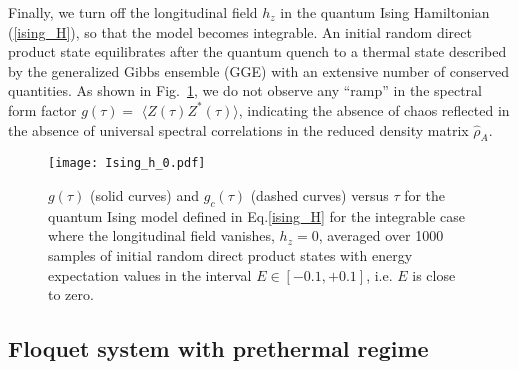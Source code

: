\documentclass[aps,prb,preprint,onecolumn,amsmath,amssymb,superscriptaddress,eqsecnum,floatfix,scrartcl]{revtex4-1}
\begin{document}
Finally, we turn off the longitudinal field $h_z$
in the quantum Ising Hamiltonian (\ref{ising_H}),
 so that the model becomes integrable. 
An
initial random direct product state
equilibrates after the quantum quench
to a thermal state described by the generalized Gibbs ensemble (GGE) with an extensive number of conserved quantities.\cite{Rigol2007,Rigol2006,Calabrese2007} As shown in Fig.~\ref{fig:ising_h_0}, we do not observe any ``ramp'' in
the spectral form factor $g(\tau)=$  $\langle Z(\tau)Z^*(\tau)\rangle$, 
indicating the absence of chaos
reflected in the absence of universal spectral correlations 
in the reduced density matrix  ${\hat \rho}_A$.


\begin{figure}%
\centering
\texttt{[image: Ising\_h\_0.pdf]}
\caption{
$g(\tau)$ (solid curves) and $g_c(\tau)$ (dashed curves) versus $\tau$ for the quantum  Ising model defined in Eq.\eqref{ising_H} for the integrable case where the longitudinal field  vanishes,  $h_z=0$, averaged over 1000 samples of  initial random direct product states
with energy expectation values in the interval  $E\in [-0.1, + 0.1]$, i.e. $E$ is close to zero.
}
\label{fig:ising_h_0}
\end{figure}

\subsection{Floquet system with prethermal regime}
\label{LabelSectionFloquetPrethermal}
\end{document}
